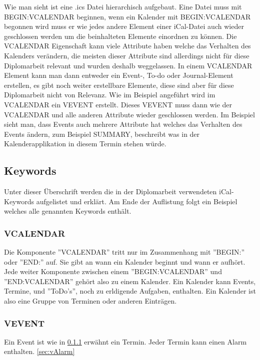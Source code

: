 Wie man sieht ist eine .ics Datei hierarchisch aufgebaut. Eine Datei muss mit BEGIN:VCALENDAR beginnen, wenn ein Kalender mit BEGIN:VCALENDAR begonnen wird muss er wie jedes andere Element einer iCal-Datei auch wieder geschlossen werden um die beinhalteten Elemente einordnen zu können. Die VCALENDAR Eigenschaft kann viele Attribute haben welche das Verhalten des Kalenders verändern, die meisten dieser Attribute sind allerdings nicht für diese Diplomarbeit relevant und wurden deshalb weggelassen. In einem VCALENDAR Element kann man dann entweder ein Event-, To-do oder Journal-Element erstellen, es gibt noch weiter erstellbare Elemente, diese sind aber für diese Diplomarbeit nicht von Relevanz. Wie im Beispiel angeführt wird im VCALENDAR ein VEVENT erstellt. Dieses VEVENT muss dann wie der VCALENDAR und alle anderen Attribute wieder geschlossen werden. Im Beispiel sieht man, dass Events auch mehrere Attribute hat welches das Verhalten des Events ändern, zum Beispiel SUMMARY, beschreibt was in der Kalenderapplikation in diesem Termin stehen würde.\\

\pagebreak
\renewcommand{\theauthor}{Dario Wagner}

\subsection{Keywords}
\label{sec:keywords}
Unter dieser Überschrift werden die in der Diplomarbeit verwendeten iCal-Keywords aufgelistet und erklärt. Am Ende der Auflistung folgt ein Beispiel welches alle genannten Keywords enthält. 
\subsubsection{VCALENDAR}
\label{sec:vCalendar} 
Die Komponente ''VCALENDAR'' tritt nur im Zusammenhang mit ''BEGIN:'' oder ''END:'' auf. Sie gibt an wann ein Kalender beginnt und wann er aufhört. Jede weiter Komponente zwischen einem ''BEGIN:VCALENDAR'' und ''END:VCALENDAR'' gehört also zu einem Kalender. Ein Kalender kann Events, Termine, und ''ToDo's'', noch zu erldigende Aufgaben, enthalten. Ein Kalender ist also eine Gruppe von Terminen oder anderen Einträgen.
\subsubsection{VEVENT}
\label{sec:vEvent} 
Ein Event ist wie in \ref{sec:vCalendar} erwähnt ein Termin. Jeder Termin kann einen Alarm enthalten.  \ref{sec:vAlarm}
